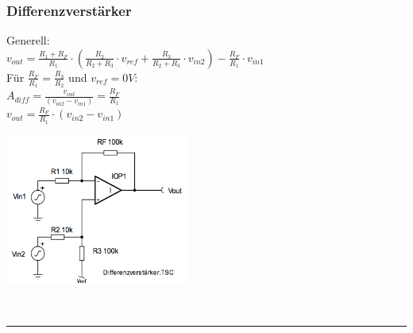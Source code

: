 		\begin{minipage}[c]{12cm}
		\subsubsection{Differenzverstärker}
				Generell: \\
				$v_{out} = \frac{R_1+R_F}{R_1} \cdot (\frac{R_2}{R_2+R_3} \cdot v_{ref} + 
				\frac{R_3}{R_2+R_3} \cdot v_{in2}) - \frac{R_F}{R_1} \cdot v_{in1} $ 
				\bigskip \\
				Für $\frac{R_F}{R_1}=\frac{R_3}{R_2}$ und $v_{ref}=0V$:
				\smallskip \\
            	$A_{diff}=\frac{v_{out}}{(v_{in2}-v_{in1})}=\frac{R_F}{R_1}$\\
            	$v_{out} = \frac{R_F}{R_1}\cdot (v_{in2}-v_{in1})$\\
            \end{minipage}
			\begin{minipage}[c]{6cm}
            	\includegraphics[width=6cm]{./images/differenzver.png}
            \end{minipage}\\
\hrule

